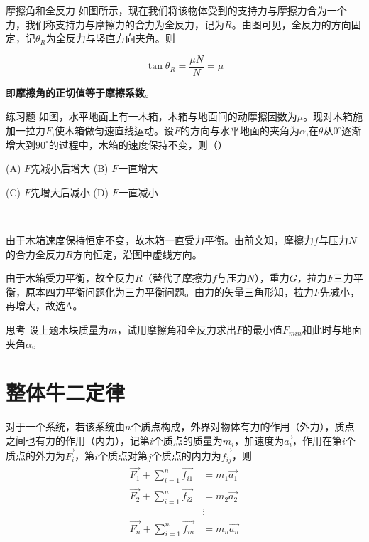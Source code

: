 

\begin{defi}{摩擦角和全反力}{}
如图所示，现在我们将该物体受到的支持力与摩擦力合为一个力，我们称支持力与摩擦力的合力为全反力，记为$R$。由图可见，全反力的方向固定，记$\theta_R$为全反力与竖直方向夹角。则

$$\tan{\theta_R}  = \frac{\mu N}{N} = \mu$$

即\textbf{摩擦角的正切值等于摩擦系数}。
\end{defi}

\begin{ep}{练习题}{}
如图，水平地面上有一木箱，木箱与地面间的动摩擦因数为$\mu$。现对木箱施加一拉力$F$,使木箱做匀速直线运动。设$F$的方向与水平地面的夹角为$\alpha$,在$\theta$从$0^{\circ}$逐渐增大到$90^{\circ}$的过程中，木箱的速度保持不变，则（）


\begin{minipage}[b]{0.6\linewidth}
(A) $F$先减小后增大 \quad (B) $F$一直增大

(C) $F$先增大后减小 \quad (D) $F$一直减小
\end{minipage}
\hfill
\begin{minipage}[b]{0.3\linewidth}

\end{minipage}
~\\

\begin{minipage}[b]{0.6\linewidth}
由于木箱速度保持恒定不变，故木箱一直受力平衡。由前文知，摩擦力$f$与压力$N$的合力全反力$R$方向恒定，沿图中虚线方向。
\end{minipage}
\hfill
\begin{minipage}[b]{0.3\linewidth}

\end{minipage}

由于木箱受力平衡，故全反力$R$（替代了摩擦力$f$与压力$N$），重力$G$，拉力$F$三力平衡，原本四力平衡问题化为三力平衡问题。由力的矢量三角形知，拉力$F$先减小，再增大，故选A。
\end{ep}

\begin{mk}{思考}{}
设上题木块质量为$m$，试用摩擦角和全反力求出$F$的最小值$F_{min}$和此时与地面夹角$\alpha$。
\end{mk}

\section{整体牛二定律}

对于一个系统，若该系统由$n$个质点构成，外界对物体有力的作用（外力），质点之间也有力的作用（内力），记第$i$个质点的质量为$m_i$，加速度为$\vec{a_i}$，作用在第$i$个质点的外力为$\vec{F_i}$，第$i$个质点对第$j$个质点的内力为$\vec{f_{ij}}$，则
\begin{subequations}
\begin{align*}
\vec{F_1} + \sum_{i=1}^{n} \vec{f_{i1}} &= m_1 \vec{a_1} \\
\vec{F_2} + \sum_{i=1}^{n} \vec{f_{i2}} &= m_2 \vec{a_2} \\
&\vdots \\
\vec{F_n} + \sum_{i=1}^{n} \vec{f_{in}} &= m_n \vec{a_n} 
\end{align*}
\end{subequations}

